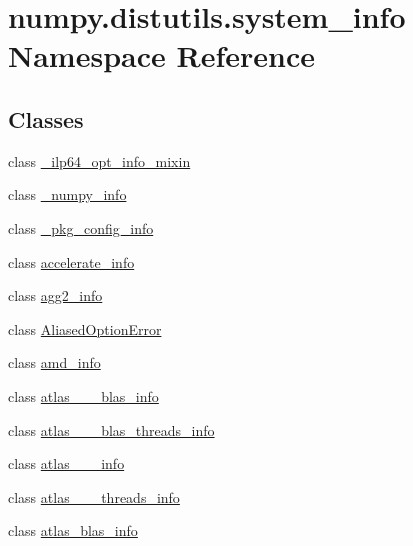 \hypertarget{namespacenumpy_1_1distutils_1_1system__info}{}\section{numpy.\+distutils.\+system\+\_\+info Namespace Reference}
\label{namespacenumpy_1_1distutils_1_1system__info}
\subsection*{Classes}
\begin{DoxyCompactItemize}
\item 
class \hyperlink{classnumpy_1_1distutils_1_1system__info_1_1__ilp64__opt__info__mixin}{\+\_\+ilp64\+\_\+opt\+\_\+info\+\_\+mixin}
\item 
class \hyperlink{classnumpy_1_1distutils_1_1system__info_1_1__numpy__info}{\+\_\+numpy\+\_\+info}
\item 
class \hyperlink{classnumpy_1_1distutils_1_1system__info_1_1__pkg__config__info}{\+\_\+pkg\+\_\+config\+\_\+info}
\item 
class \hyperlink{classnumpy_1_1distutils_1_1system__info_1_1accelerate__info}{accelerate\+\_\+info}
\item 
class \hyperlink{classnumpy_1_1distutils_1_1system__info_1_1agg2__info}{agg2\+\_\+info}
\item 
class \hyperlink{classnumpy_1_1distutils_1_1system__info_1_1AliasedOptionError}{Aliased\+Option\+Error}
\item 
class \hyperlink{classnumpy_1_1distutils_1_1system__info_1_1amd__info}{amd\+\_\+info}
\item 
class \hyperlink{classnumpy_1_1distutils_1_1system__info_1_1atlas__3__10__blas__info}{atlas\+\_\+\_\+\_\+blas\+\_\+info}
\item 
class \hyperlink{classnumpy_1_1distutils_1_1system__info_1_1atlas__3__10__blas__threads__info}{atlas\+\_\+\_\+\_\+blas\+\_\+threads\+\_\+info}
\item 
class \hyperlink{classnumpy_1_1distutils_1_1system__info_1_1atlas__3__10__info}{atlas\+\_\+\_\+\_\+info}
\item 
class \hyperlink{classnumpy_1_1distutils_1_1system__info_1_1atlas__3__10__threads__info}{atlas\+\_\+\_\+\_\+threads\+\_\+info}
\item 
class \hyperlink{classnumpy_1_1distutils_1_1system__info_1_1atlas__blas__info}{atlas\+\_\+blas\+\_\+info}
\item 

\end{DoxyCompactItemize}
